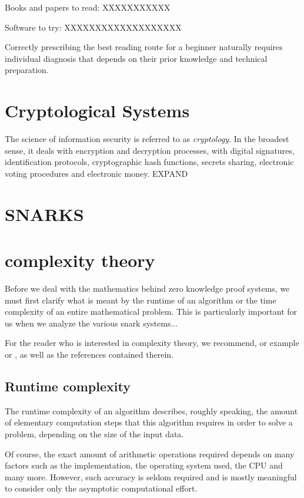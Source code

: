 Books and papers to read: XXXXXXXXXXX

Software to try: XXXXXXXXXXXXXXXXXXX

Correctly prescribing the best reading route for a beginner naturally requires individual diagnosis that depends on their prior knowledge and technical preparation.

\section{Cryptological Systems}
The science of information security is referred to as \textit{cryptology}. In the broadest sense, it deals with encryption and decryption processes, with digital signatures, identification protocols, cryptographic hash functions, secrets sharing, electronic voting procedures and electronic money. EXPAND

\section{SNARKS}



\section{complexity theory}
Before we deal with the mathematics behind zero knowledge proof systems, we must first clarify what is meant by the runtime of an algorithm or the time complexity of an entire mathematical problem. This is particularly important for us when we analyze the various snark systems...

For the reader who is interested in complexity theory, we recommend, or example 
or 
, as well as the references contained therein.

\subsection{Runtime complexity}
The runtime complexity of an algorithm describes, roughly speaking, the amount of elementary computation steps that this algorithm requires in order to solve a problem, depending on the size of the input data.

Of course, the exact amount of arithmetic operations required depends on many factors such as the implementation, the operating system used, the CPU and many more. However, such accuracy is seldom required and is mostly meaningful to consider only the asymptotic computational effort.

